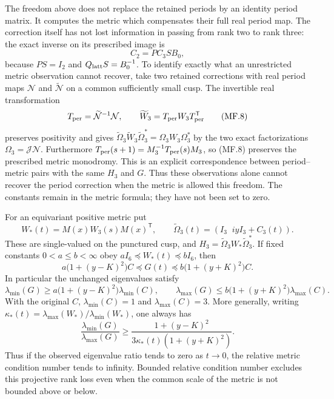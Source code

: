 The freedom above does not replace the retained periods by an identity
period matrix.  It computes the metric which compensates their full real
period map.  The correction itself has not lost information in passing
from rank two to rank three: the exact inverse on its prescribed image is
\[
 C_2=P C_3 S B_0,
\]
because $PS=I_2$ and $Q_{\rm latt}S=B_0^{-1}$.
To identify exactly what an unrestricted metric observation cannot recover,
take two retained corrections with real period maps $\mathcal N$ and
$\widetilde{\mathcal N}$ on a common sufficiently small cusp.  The
invertible real transformation
\[
 T_{\rm per}=\widetilde{\mathcal N}^{-1}\mathcal N,\qquad
 \widetilde W_3=T_{\rm per}W_3T_{\rm per}^{\mathsf T}
                                                               \tag{MF.8}
\]
preserves positivity and gives
$\widetilde\Omega_3\widetilde W_3\widetilde\Omega_3^*
=\Omega_3W_3\Omega_3^*$ by the two exact factorizations
$\Omega_3=\mathcal J\mathcal N$.
Furthermore $T_{\rm per}(s+1)=M_3^{-1}T_{\rm per}(s)M_3$, so (MF.8)
preserves the prescribed metric monodromy.  This is an explicit
correspondence between period--metric pairs with the same $H_3$ and $G$.
Thus these observations alone cannot recover the period correction when
the metric is allowed this freedom.  The constants remain in the metric
formula; they have not been set to zero.

\begin{proposition}
\label{q444:metric-condition}
For an equivariant positive metric put
\[
 W_*(t)=M(x)W_3(s)M(x)^{\mathsf T},\qquad
 \widetilde\Omega_3(t)=(I_3\;\;iyI_3+C_3(t)).
\]
These are single-valued on the punctured cusp, and
$H_3=\widetilde\Omega_3W_*\widetilde\Omega_3^*$.
If fixed constants $0<a\leq b<\infty$ obey
$aI_6\preceq W_*(t)\preceq bI_6$, then
\[
 a\bigl(1+(y-K)^2\bigr)C
 \preceq G(t)\preceq
 b\bigl(1+(y+K)^2\bigr)C.                                    \tag{MC.1}
\]
In particular the unchanged eigenvalues satisfy
\[
 \lambda_{\min}(G)\geq a\bigl(1+(y-K)^2\bigr)\lambda_{\min}(C),
 \qquad
 \lambda_{\max}(G)\leq b\bigl(1+(y+K)^2\bigr)\lambda_{\max}(C).
                                                               \tag{MC.2}
\]
With the original $C$, $\lambda_{\min}(C)=1$ and
$\lambda_{\max}(C)=3$.  More generally, writing
$\kappa_*(t)=\lambda_{\max}(W_*)/\lambda_{\min}(W_*)$, one always has
\[
 \frac{\lambda_{\min}(G)}{\lambda_{\max}(G)}
 \geq\frac{1+(y-K)^2}{3\kappa_*(t)(1+(y+K)^2)}.               \tag{MC.3}
\]
Thus if the observed eigenvalue ratio tends to zero as $t\to0$, the
relative metric condition number tends to infinity.  Bounded relative
condition number excludes this projective rank loss even when the common
scale of the metric is not bounded above or below.
\end{proposition}

